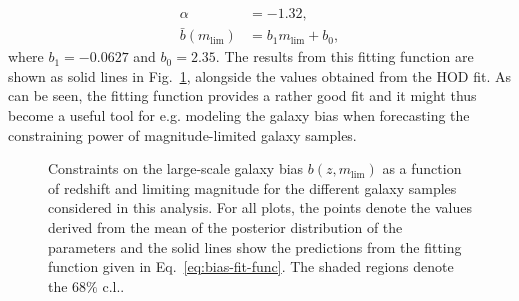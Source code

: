 \documentclass[a4paper,11pt]{article}
\begin{document}
\begin{align}
\alpha &= -1.32, \\
\bar{b}(m_{\mathrm{lim}}) &= b_{1}m_{\mathrm{lim}} + b_{0},
\label{eq:bias-fit-func}
\end{align}  
where $b_{1} = -0.0627$ and $b_{0} = 2.35$. The results from this fitting function are shown as solid lines in Fig.~\ref{fig:magnitude-cuts-bias}, alongside the values obtained from the HOD fit. As can be seen, the fitting function provides a rather good fit and it might thus become a useful tool for e.g. modeling the galaxy bias when forecasting the constraining power of magnitude-limited galaxy samples.

\begin{figure}
\begin{center}
\caption{Constraints on the large-scale galaxy bias $b(z, m_{\mathrm{lim}})$ as a function of redshift and limiting magnitude for the different galaxy samples considered in this analysis. For all plots, the points denote the values derived from the mean of the posterior distribution of the parameters and the solid lines show the predictions from the fitting function given in Eq.~\ref{eq:bias-fit-func}. The shaded regions denote the $68 \%$ c.l..}
\label{fig:magnitude-cuts-bias}
\end{center}
\end{figure}
\end{document}

